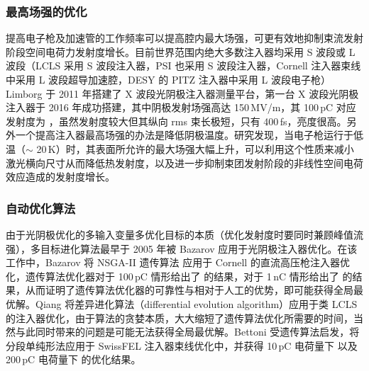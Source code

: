 \subsubsection{最高场强的优化}
提高电子枪及加速管的工作频率可以提高腔内最大场强，可更有效地抑制束流发射阶段空间电荷力发射度增长。目前世界范围内绝大多数注入器均采用 S 波段或 L 波段（LCLS 采用 S 波段注入器\cite{Zhou:2015aa}，PSI 也采用 S 波段注入器\cite{prat2014emittance}，Cornell 注入器束线中采用 L 波段超导加速腔\cite{shemelin2012frequency,Bartnik:2015aa}，DESY 的 PITZ 注入器中采用 L 波段电子枪\cite{Krasilnikov:2012aa}）Limborg 于 2011 年搭建了 X 波段光阴极注入器测量平台\cite{Limborg-Deprey:2011aa}，第一台 X 波段光阴极注入器于 2016 年成功搭建\cite{Limborg-Deprey:2016aa}，其中阴极发射场强高达 150\,MV/m，其 100\,pC 对应发射度为 ，虽然发射度较大但其纵向 rms 束长极短，只有 400\,fs，亮度很高。另外一个提高注入器最高场强的办法是降低阴极温度\cite{Rosenzweig:2016aa}。研究发现，当电子枪运行于低温（$\sim$ 20\,K）时，其表面所允许的最大场强大幅上升，可以利用这个性质来减小激光横向尺寸从而降低热发射度，以及进一步抑制束团发射阶段的非线性空间电荷效应造成的发射度增长。

\subsubsection{自动优化算法}
由于光阴极优化的多输入变量多优化目标的本质（优化发射度时要同时兼顾峰值流强），多目标进化算法最早于 2005 年被 Bazarov 应用于光阴极注入器优化\cite{Bazarov:2005aa}。在该工作中，Bazarov 将 NSGA-II 遗传算法\cite{Deb:2002aa} 应用于 Cornell 的直流高压枪注入器优化，遗传算法优化器对于 100\,pC 情形给出了  的结果，对于 1\,nC 情形给出了  的结果，从而证明了遗传算法优化器的可靠性与相对于人工的优势，即可能获得全局最优解。Qiang 将差异进化算法（differential evolution algorithm）应用于类 LCLS 的注入器优化，由于算法的贪婪本质，大大缩短了遗传算法优化所需要的时间\cite{Qiang:2013aa}，当然与此同时带来的问题是可能无法获得全局最优解。Bettoni 受遗传算法启发，将分段单纯形法应用于 SwissFEL 注入器束线优化中，并获得 10\,pC 电荷量下  以及 200\,pC 电荷量下  的优化结果\cite{Bettoni:2015aa}。

